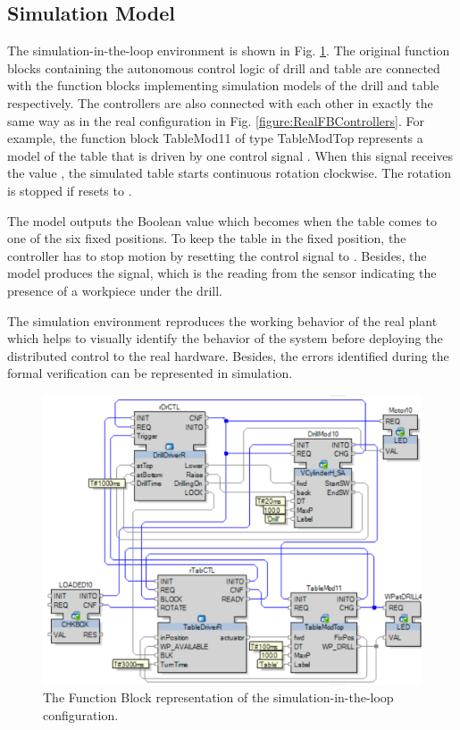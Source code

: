 \begin{bibunit}
\section{Simulation Model}

The simulation-in-the-loop environment is shown in Fig. \ref{figure:SimulationFBDiagram}.  The original  function blocks containing the autonomous control logic of drill and table are connected with the function blocks implementing simulation models of the drill and table respectively. The controllers are also connected with each other in exactly the same way as in the real configuration in Fig. \ref{figure:RealFBControllers}. 
For example, the function block TableMod11 of type TableModTop represents a model of the table that is driven by one control signal . When this signal receives the value , the simulated table starts continuous rotation clockwise. The rotation is stopped if  resets to .

The model outputs the Boolean value  which becomes  when the table comes to one of the six fixed positions. To keep the table in the fixed position, the controller has to stop motion by resetting the control signal  to . Besides, the model produces the  signal, which is the reading from the sensor indicating the presence of a workpiece under the drill.

The simulation environment reproduces the working behavior of the real plant which helps to visually identify the behavior of the system before deploying the distributed control to the real hardware. Besides, the errors identified during the formal verification can be represented in simulation. 

\begin{figure}
    \centering
    \includegraphics[scale = 0.3]{MX_Papers/Paper2/images/SimulationFBsystem.png}
    \caption{The Function Block representation of the  simulation-in-the-loop configuration.}
    \label{figure:SimulationFBDiagram}
\end{figure} 




\end{bibunit}
